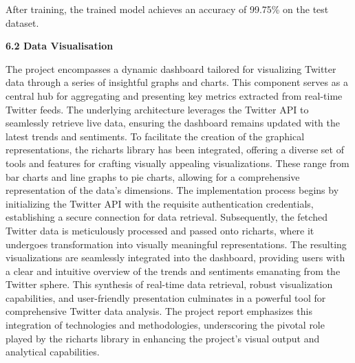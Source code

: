 \documentclass[a4paper,12pt]{article}
\begin{document}
{{{After training, the trained model achieves an accuracy of 99.75\% on the test dataset.


\begin{flushleft}
			\fontsize{13}{15}\selectfont\textbf{6.2 Data Visualisation}
			\label{dv}
		\end{flushleft}

The project encompasses a dynamic dashboard tailored for visualizing Twitter data through a series of insightful graphs and charts. This component serves as a central hub for aggregating and presenting key metrics extracted from real-time Twitter feeds. The underlying architecture leverages the Twitter API to seamlessly retrieve live data, ensuring the dashboard remains updated with the latest trends and sentiments. To facilitate the creation of the graphical representations, the richarts library has been integrated, offering a diverse set of tools and features for crafting visually appealing visualizations. These range from bar charts and line graphs to pie charts, allowing for a comprehensive representation of the data's dimensions. The implementation process begins by initializing the Twitter API with the requisite authentication credentials, establishing a secure connection for data retrieval. Subsequently, the fetched Twitter data is meticulously processed and passed onto richarts, where it undergoes transformation into visually meaningful representations. The resulting visualizations are seamlessly integrated into the dashboard, providing users with a clear and intuitive overview of the trends and sentiments emanating from the Twitter sphere. This synthesis of real-time data retrieval, robust visualization capabilities, and user-friendly presentation culminates in a powerful tool for comprehensive Twitter data analysis. The project report emphasizes this integration of technologies and methodologies, underscoring the pivotal role played by the richarts library in enhancing the project's visual output and analytical capabilities.





}}}
\end{document}
